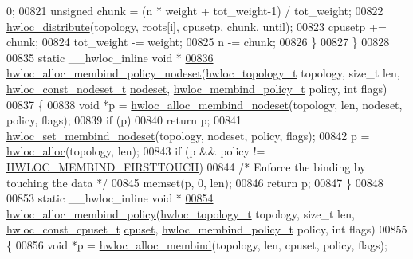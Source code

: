\begin{DoxyCode}
      0;
00821     \textcolor{keywordtype}{unsigned} chunk = (n * weight + tot\_weight-1) / tot\_weight;
00822     \hyperlink{a00059_ga6d5c88292ad5aa062c1bebc99369c042}{hwloc_distribute}(topology, roots[i], cpusetp, chunk, until);
00823     cpusetp += chunk;
00824     tot\_weight -= weight;
00825     n -= chunk;
00826   \}
00827 \}
00828 
00835 \textcolor{keyword}{static} \_\_hwloc\_inline \textcolor{keywordtype}{void} *
\hypertarget{a00031_source_l00836}{}\hyperlink{a00059_ga3e772fbc4de626ed80f13d332b7d4d03}{00836} \hyperlink{a00059_ga3e772fbc4de626ed80f13d332b7d4d03}{hwloc_alloc_membind_policy_nodeset}(\hyperlink{a00039_ga9d1e76ee15a7dee158b786c30b6a6e38}{hwloc_topology_t} topology, \textcolor{keywordtype}{size\_t} len, 
      \hyperlink{a00040_ga2f5276235841ad66a79bedad16a5a10c}{hwloc_const_nodeset_t} \hyperlink{a00016_a08f0d0e16c619a6e653526cbee4ffea3}{nodeset}, \hyperlink{a00050_gac9764f79505775d06407b40f5e4661e8}{hwloc_membind_policy_t} policy, \textcolor{keywordtype}{int} flags)
00837 \{
00838   \textcolor{keywordtype}{void} *p = \hyperlink{a00050_gaeaa00714a9c4319bda0a74ca6f8720e8}{hwloc_alloc_membind_nodeset}(topology, len, nodeset, policy, flags);
00839   \textcolor{keywordflow}{if} (p)
00840     \textcolor{keywordflow}{return} p;
00841   \hyperlink{a00050_ga747962cbb16fd12ad6d126011c734a27}{hwloc_set_membind_nodeset}(topology, nodeset, policy, flags);
00842   p = \hyperlink{a00050_gac5586e58cf25c3596b7d4aa31ce13259}{hwloc_alloc}(topology, len);
00843   \textcolor{keywordflow}{if} (p && policy != \hyperlink{a00050_ggac9764f79505775d06407b40f5e4661e8a979c7aa78dd32780858f30f47a72cca0}{HWLOC_MEMBIND_FIRSTTOUCH})
00844     \textcolor{comment}{/* Enforce the binding by touching the data */}
00845     memset(p, 0, len);
00846   \textcolor{keywordflow}{return} p;
00847 \}
00848 
00853 \textcolor{keyword}{static} \_\_hwloc\_inline \textcolor{keywordtype}{void} *
\hypertarget{a00031_source_l00854}{}\hyperlink{a00059_ga6178c6a9ec1dd88ec9f6a9fcdcc7d634}{00854} \hyperlink{a00059_ga6178c6a9ec1dd88ec9f6a9fcdcc7d634}{hwloc_alloc_membind_policy}(\hyperlink{a00039_ga9d1e76ee15a7dee158b786c30b6a6e38}{hwloc_topology_t} topology, \textcolor{keywordtype}{size\_t} len, 
      \hyperlink{a00040_ga1f784433e9b606261f62d1134f6a3b25}{hwloc_const_cpuset_t} \hyperlink{a00016_a67925e0f2c47f50408fbdb9bddd0790f}{cpuset}, \hyperlink{a00050_gac9764f79505775d06407b40f5e4661e8}{hwloc_membind_policy_t} policy, \textcolor{keywordtype}{int} flags)
00855 \{
00856   \textcolor{keywordtype}{void} *p = \hyperlink{a00050_ga221a7edc5d436300374fa16463f607e5}{hwloc_alloc_membind}(topology, len, cpuset, policy, flags);

\end{DoxyCode}
